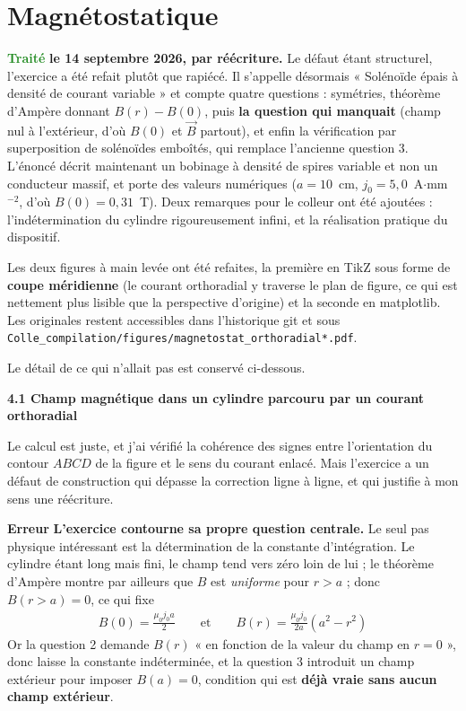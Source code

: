 \documentclass[a4paper,11pt]{article}
\newcommand{\exo}[1]{\vspace{0.7\baselineskip}\noindent\textbf{\large #1}\par\nopagebreak\vspace{0.2\baselineskip}}
\newcommand{\erreur}{\textcolor{BrickRed}{\textbf{Erreur}}}
\newcommand{\traite}{\textcolor{ForestGreen}{\textbf{Traité}}}
\begin{document}
\section{Magnétostatique}

\traite{} \textbf{le 14 septembre 2026, par réécriture.} Le défaut étant structurel, l'exercice a été
refait plutôt que rapiécé. Il s'appelle désormais « Solénoïde épais à densité de courant variable »
et compte quatre questions : symétries, théorème d'Ampère donnant $B(r)-B(0)$, puis
\textbf{la question qui manquait} (champ nul à l'extérieur, d'où $B(0)$ et $\vec B$ partout), et
enfin la vérification par superposition de solénoïdes emboîtés, qui remplace l'ancienne question 3.
L'énoncé décrit maintenant un bobinage à densité de spires variable et non un conducteur massif, et
porte des valeurs numériques ($a=10$~cm, $j_0=5{,}0$~A$\cdot$mm$^{-2}$, d'où $B(0)=0{,}31$~T).
Deux remarques pour le colleur ont été ajoutées : l'indétermination du cylindre rigoureusement infini,
et la réalisation pratique du dispositif.

\medskip
Les deux figures à main levée ont été refaites, la première en TikZ sous forme de \textbf{coupe
méridienne} (le courant orthoradial y traverse le plan de figure, ce qui est nettement plus lisible
que la perspective d'origine) et la seconde en matplotlib. Les originales restent accessibles dans
l'historique git et sous \texttt{Colle\_compilation/figures/magnetostat\_orthoradial*.pdf}.

\medskip
Le détail de ce qui n'allait pas est conservé ci-dessous.

\exo{4.1 Champ magnétique dans un cylindre parcouru par un courant orthoradial}

Le calcul est juste, et j'ai vérifié la cohérence des signes entre l'orientation du contour $ABCD$ de
la figure et le sens du courant enlacé. Mais l'exercice a un défaut de construction qui dépasse la
correction ligne à ligne, et qui justifie à mon sens une réécriture.

\medskip
\erreur{} \textbf{L'exercice contourne sa propre question centrale.} Le seul pas physique
intéressant est la détermination de la constante d'intégration. Le cylindre étant long mais fini, le
champ tend vers zéro loin de lui ; le théorème d'Ampère montre par ailleurs que $B$ est
\textit{uniforme} pour $r>a$ ; donc $B(r>a)=0$, ce qui fixe
\begin{align*}
	B(0)=\frac{\mu_0j_0a}{2}
	\qquad\text{et}\qquad
	B(r)=\frac{\mu_0j_0}{2a}\left(a^2-r^2\right)
\end{align*}
Or la question 2 demande $B(r)$ « en fonction de la valeur du champ en $r=0$ », donc laisse la
constante indéterminée, et la question 3 introduit un champ extérieur pour imposer $B(a)=0$,
condition qui est \textbf{déjà vraie sans aucun champ extérieur}.
\end{document}
